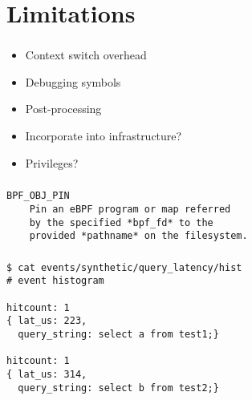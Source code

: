 \documentclass[usenames,dvipsnames, 18pt, compress, aspectratio=169]{beamer}
\begin{document}
\section{Limitations}


\begin{frame}[fragile]{}
    \frametitle{}
    \begin{center}
        \begin{itemize}[label={}]
            \item<+-> {Context switch overhead}
            \item<+-> {Debugging symbols}
            \item<+-> {Post-processing}
            \item<+-> {Incorporate into infrastructure?}
            \item<+-> {Privileges?}
        \end{itemize}
    \end{center}
\end{frame}

\begin{frame}[fragile]{}
    \frametitle{}
    \begin{center}
        \begin{verbatim}
BPF_OBJ_PIN
    Pin an eBPF program or map referred
    by the specified *bpf_fd* to the
    provided *pathname* on the filesystem.
        \end{verbatim}
    \end{center}
\end{frame}

\begin{frame}[fragile]{}
    \frametitle{}
    \begin{center}
        \begin{verbatim}
$ cat events/synthetic/query_latency/hist
# event histogram

hitcount: 1
{ lat_us: 223,
  query_string: select a from test1;}

hitcount: 1
{ lat_us: 314,
  query_string: select b from test2;}
        \end{verbatim}
    \end{center}
\end{frame}
\end{document}
